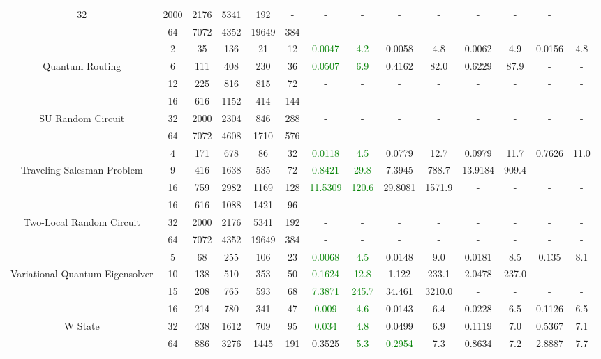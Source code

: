 \begin{table}[htb]
{\begin{tabular}{|c|c|c|c|c|c|c|c|c|c|c|c|c|c|}
32 & 2000 & 2176 & 5341 & 192
 & - & -
 & - & -
 & - & -
 & - & -
 \\
 & 
64 & 7072 & 4352 & 19649 & 384
 & - & -
 & - & -
 & - & -
 & - & -
 \\
\hline
 & 
2 & 35 & 136 & 21 & 12
 & \textcolor{green}{0.0047} & \textcolor{green}{4.2}
 & 0.0058 & 4.8
 & 0.0062 & 4.9
 & 0.0156 & 4.8
 \\
Quantum Routing & 
6 & 111 & 408 & 230 & 36
 & \textcolor{green}{0.0507} & \textcolor{green}{6.9}
 & 0.4162 & 82.0
 & 0.6229 & 87.9
 & - & -
 \\
 & 
12 & 225 & 816 & 815 & 72
 & - & -
 & - & -
 & - & -
 & - & -
 \\
\hline
 & 
16 & 616 & 1152 & 414 & 144
 & - & -
 & - & -
 & - & -
 & - & -
 \\
SU Random Circuit & 
32 & 2000 & 2304 & 846 & 288
 & - & -
 & - & -
 & - & -
 & - & -
 \\
 & 
64 & 7072 & 4608 & 1710 & 576
 & - & -
 & - & -
 & - & -
 & - & -
 \\
\hline
 & 
4 & 171 & 678 & 86 & 32
 & \textcolor{green}{0.0118} & \textcolor{green}{4.5}
 & 0.0779 & 12.7
 & 0.0979 & 11.7
 & 0.7626 & 11.0
 \\
Traveling Salesman Problem & 
9 & 416 & 1638 & 535 & 72
 & \textcolor{green}{0.8421} & \textcolor{green}{29.8}
 & 7.3945 & 788.7
 & 13.9184 & 909.4
 & - & -
 \\
 & 
16 & 759 & 2982 & 1169 & 128
 & \textcolor{green}{11.5309} & \textcolor{green}{120.6}
 & 29.8081 & 1571.9
 & - & -
 & - & -
 \\
\hline
 & 
16 & 616 & 1088 & 1421 & 96
 & - & -
 & - & -
 & - & -
 & - & -
 \\
Two-Local Random Circuit & 
32 & 2000 & 2176 & 5341 & 192
 & - & -
 & - & -
 & - & -
 & - & -
 \\
 & 
64 & 7072 & 4352 & 19649 & 384
 & - & -
 & - & -
 & - & -
 & - & -
 \\
\hline
 & 
5 & 68 & 255 & 106 & 23
 & \textcolor{green}{0.0068} & \textcolor{green}{4.5}
 & 0.0148 & 9.0
 & 0.0181 & 8.5
 & 0.135 & 8.1
 \\
Variational Quantum Eigensolver & 
10 & 138 & 510 & 353 & 50
 & \textcolor{green}{0.1624} & \textcolor{green}{12.8}
 & 1.122 & 233.1
 & 2.0478 & 237.0
 & - & -
 \\
 & 
15 & 208 & 765 & 593 & 68
 & \textcolor{green}{7.3871} & \textcolor{green}{245.7}
 & 34.461 & 3210.0
 & - & -
 & - & -
 \\
\hline
 & 
16 & 214 & 780 & 341 & 47
 & \textcolor{green}{0.009} & \textcolor{green}{4.6}
 & 0.0143 & 6.4
 & 0.0228 & 6.5
 & 0.1126 & 6.5
 \\
W State & 
32 & 438 & 1612 & 709 & 95
 & \textcolor{green}{0.034} & \textcolor{green}{4.8}
 & 0.0499 & 6.9
 & 0.1119 & 7.0
 & 0.5367 & 7.1
 \\
 & 
64 & 886 & 3276 & 1445 & 191
 & 0.3525 & \textcolor{green}{5.3}
 & \textcolor{green}{0.2954} & 7.3
 & 0.8634 & 7.2
 & 2.8887 & 7.7
 \\
\hline
\end{tabular}}
\end{table}